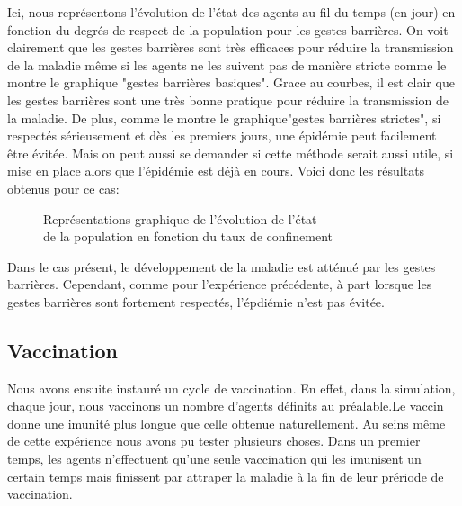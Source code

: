 \documentclass[a4paper, 12pt]{article}
\begin{document}
\newpage

Ici, nous représentons l'évolution de l'état des agents au fil du temps (en jour) en fonction du degrés de respect de la population pour les gestes barrières.
On voit clairement que les gestes barrières sont très efficaces pour réduire la transmission de la maladie même si les agents ne les suivent pas de manière stricte comme le montre le graphique
"gestes barrières basiques". Grace au courbes, il est clair que les gestes barrières sont une très bonne
pratique pour réduire la transmission de la maladie. De plus, comme le montre le graphique"gestes barrières strictes", si respectés sérieusement et dès les premiers jours, une épidémie peut facilement
être évitée. Mais on peut aussi se demander si cette méthode serait aussi utile, si mise en place alors que l'épidémie est déjà en cours. Voici donc les résultats obtenus pour ce cas:

\begin{figure}[!h]
	\centering
	\qquad
	\centering
	\qquad
	\caption{Représentations graphique de l'évolution de l'état\\ de la population en fonction du taux de confinement}

\end{figure}

\newpage

Dans le cas présent, le développement de la maladie est atténué par les gestes barrières. Cependant, comme pour l'expérience précédente, à part lorsque les gestes barrières sont fortement respectés, 
l'épdiémie n'est pas évitée.

\newpage

\subsection{Vaccination}

Nous avons ensuite instauré un cycle de vaccination. En effet, dans la simulation, chaque jour, nous vaccinons un nombre d'agents définits au préalable.Le vaccin donne une imunité plus longue que celle obtenue 
naturellement. Au seins même de cette expérience nous avons pu tester plusieurs choses. Dans un premier temps, les agents n'effectuent qu'une seule vaccination qui les imunisent un certain temps mais finissent 
par attraper la maladie à la fin de leur prériode de vaccination.
\end{document}
